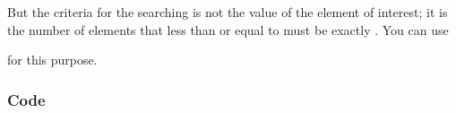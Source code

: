 \documentclass[letterpaper,12pt,english]{book}
\begin{document}
\sphinxAtStartPar
But the criteria for the searching is not the value of the element  of interest; it is the number of elements that less than or equal to  must be exactly . You can use %
\begin{footnote}[63]\sphinxAtStartFootnote
{}
%
\end{footnote} for this purpose.


\subsubsection{Code}
\label{\detokenize{Priority_Queue/378_Kth_Smallest_Element_in_a_Sorted_Matrix:id3}}
\end{document}
